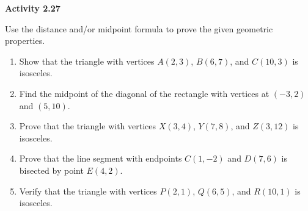 \vspace{0.3ex}
\noindent\textbf{Activity 2.27}

\vspace{0.2ex}

Use the distance and/or midpoint formula to prove the given geometric properties.

\begin{enumerate}
    \item Show that the triangle with vertices $A(2,3)$, $B(6,7)$, and $C(10,3)$ is isosceles.
    \item Find the midpoint of the diagonal of the rectangle with vertices at $(-3,2)$ and $(5,10)$.
    \item Prove that the triangle with vertices $X(3,4)$, $Y(7,8)$, and $Z(3,12)$ is isosceles.
    \item Prove that the line segment with endpoints $C(1,-2)$ and $D(7,6)$ is bisected by point $E(4,2)$.
    \item Verify that the triangle with vertices $P(2,1)$, $Q(6,5)$, and $R(10,1)$ is isosceles.
\end{enumerate}
